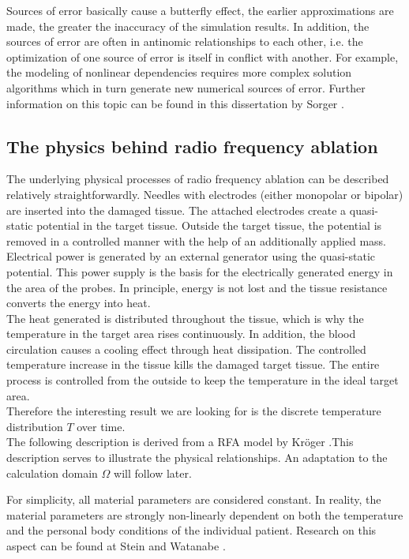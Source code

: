 \documentclass[parskip=half, titlepage=yes, 12pt, BCOR=12mm, DIV=calc]{scrartcl}
\begin{document}
Sources of error basically cause a butterfly effect, the earlier approximations are made, the greater the inaccuracy of the simulation results. In addition, the sources of error are often in antinomic relationships to each other, i.e. the optimization of one source of error is itself in conflict with another. For example, the modeling of nonlinear dependencies requires more complex solution algorithms which in turn generate new numerical sources of error. Further information on this topic can be found in this dissertation by Sorger \cite{sorger}.


\subsection{The physics behind radio frequency ablation}
The underlying physical processes of radio frequency ablation can be described relatively straightforwardly.
Needles with electrodes (either monopolar or bipolar) are inserted into the damaged tissue. The attached electrodes create a quasi-static potential in the target tissue. Outside the target tissue, the potential is removed in a controlled manner with the help of an additionally applied mass. \\

Electrical power is generated by an external generator using the quasi-static potential. This power supply is the basis for the electrically generated energy in the area of the probes.
In principle, energy is not lost and the tissue resistance converts the energy into heat. \\

The heat generated is distributed throughout the tissue, which is why the temperature in the target area rises continuously. 
In addition, the blood circulation causes a cooling effect through heat dissipation. The controlled temperature increase in the tissue kills the damaged target tissue. The entire process is controlled from the outside to keep the temperature in the ideal target area. \\

Therefore the interesting result we are looking for is the discrete temperature distribution $\si{T}$ over time. \\

The following description is derived from a RFA model by Kröger \cite{kroeger}.This description serves to illustrate the physical relationships. An adaptation to the calculation domain $\Omega$ will follow later.

For simplicity, all material parameters are considered constant. In reality, the material parameters are strongly non-linearly dependent on both the temperature and the personal body conditions of the individual patient. Research on this aspect can be found at Stein \cite{stein} and Watanabe \cite{watanabe}. \\
\end{document}
